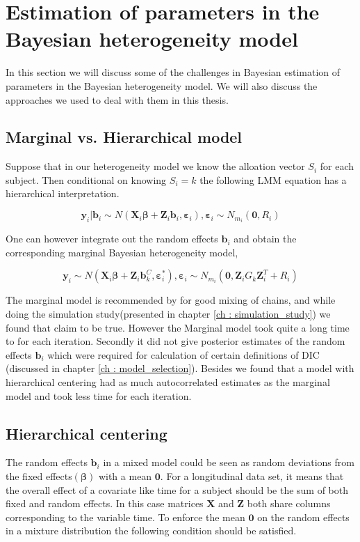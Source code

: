 
\section{Estimation of parameters in the Bayesian heterogeneity model}
In this section we will discuss some of the challenges in Bayesian estimation of parameters in the Bayesian heterogeneity model. We will also discuss the approaches we used to deal with them in this thesis.

\subsection{Marginal vs. Hierarchical model}
Suppose that in our heterogeneity model we know the alloation vector $S_i$ for each subject. Then conditional on knowing $S_i=k$ the following LMM equation has a hierarchical interpretation.

$$\boldsymbol{y}_i|\boldsymbol{b}_{i} \sim N(\boldsymbol{X}_{i}\boldsymbol{\beta} + \boldsymbol{Z}_{i}\boldsymbol{b}_{i},\boldsymbol{\varepsilon}_{i}), 
\boldsymbol{\varepsilon}_{i} \sim N_{m_i}(\boldsymbol{0}, R_i)$$

One can however integrate out the random effects $\boldsymbol{b}_{i}$ and obtain the corresponding marginal Bayesian heterogeneity model,

$$\boldsymbol{y}_i \sim N(\boldsymbol{X}_{i}\boldsymbol{\beta} + \boldsymbol{Z}_{i}\boldsymbol{b}_k^C, \boldsymbol{\varepsilon}_{i}^*), 
\boldsymbol{\varepsilon}_{i} \sim N_{m_i}(\boldsymbol{0}, \boldsymbol{Z}_{i}G_k\boldsymbol{Z}_{i}^T+ R_i)$$

The marginal model is recommended by \citet{fruhwirth-schnatter_bayesian_2004} for good mixing of chains, and while doing the simulation study(presented in chapter \ref{ch : simulation_study}) we found that claim to be true. However the Marginal model took quite a long time to for each iteration. Secondly it did not give posterior estimates of the random effects $\boldsymbol{b}_i$ which were required for calculation of certain definitions of DIC (discussed in chapter \ref{ch : model_selection}). Besides we found that a model with hierarchical centering had as much autocorrelated estimates as the marginal model and took less time for each iteration.

\subsection{Hierarchical centering}
The random effects $\boldsymbol{b}_i$ in a mixed model could be seen as random deviations from the fixed effects$(\boldsymbol{\beta})$ with a mean $\boldsymbol{0}$. For a longitudinal data set, it means that the overall effect of a covariate like time for a subject should be the sum of both fixed and random effects. In this case matrices $\boldsymbol{X}$ and $\boldsymbol{Z}$ both share columns corresponding to the variable time. To enforce the mean $\boldsymbol{0}$ on the random effects in a mixture distribution the following condition should be satisfied.

